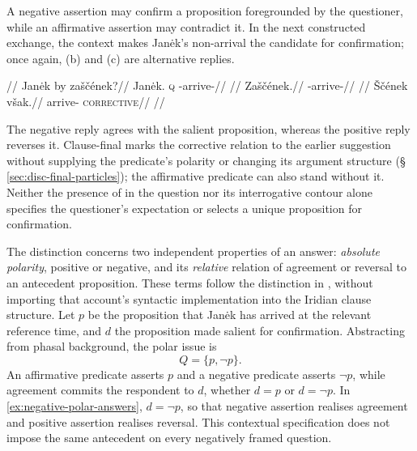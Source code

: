 A negative assertion may confirm a proposition foregrounded by the
questioner, while an affirmative assertion may contradict it. In the next
constructed exchange, the context makes Janėk's non-arrival the candidate
for confirmation; once again, (b) and (c) are alternative replies.

\pex\label{ex:negative-polar-answers}
\a
\begingl
\glpreamble {}//
\gla Janėk by zaščének?//
\glb Janėk.\Dir{} \textsc{q} \Neg{}-arrive-\Pf{}//
\glft {}//
\endgl
\a
\begingl
\gla Zaščének.//
\glb \Neg{}-arrive-\Pf{}//
\glft {}//
\endgl
\a
\begingl
\gla Ščének však.//
\glb arrive-\Pf{} \textsc{corrective}//
\glft {}//
\endgl
\xe

The negative reply agrees with the salient proposition, whereas the
positive reply reverses it. Clause-final  marks the corrective
relation to the earlier suggestion without supplying the predicate's
polarity or changing its argument structure
(§\,\ref{sec:disc-final-particles}); the affirmative predicate can also
stand without it. Neither the presence of  in the question nor
its interrogative contour alone specifies the questioner's expectation
or selects a unique proposition for confirmation.

The distinction concerns two independent properties of an answer:
\emph{absolute polarity}, positive or negative, and its \emph{relative}
relation of agreement or reversal to an antecedent proposition. These
terms follow the distinction in \cite[384--385]{roelofsenfarkas2015},
without importing that account's syntactic implementation into the
Iridian clause structure. Let $p$ be the proposition that Janėk has arrived
at the relevant reference time, and $d$ the proposition made salient for
confirmation. Abstracting from phasal background, the polar issue is
\[
 Q=\{p,\neg p\}.
\]
An affirmative predicate asserts $p$ and a negative predicate asserts
$\neg p$, while agreement commits the respondent to $d$, whether $d=p$
or $d=\neg p$. In \ref{ex:negative-polar-answers}, $d=\neg p$, so that
negative assertion realises agreement and positive assertion realises
reversal. This contextual specification does not impose the same
antecedent on every negatively framed question.

